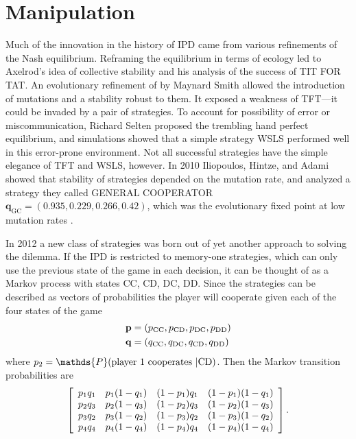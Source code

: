 

\chapter{Manipulation}

Much of the innovation in the history of IPD came from various refinements of the Nash equilibrium. Reframing the equilibrium in terms of ecology led to Axelrod's idea of collective stability and his analysis of the success of TIT FOR TAT. An evolutionary refinement of by Maynard Smith allowed the introduction of mutations and a stability robust to them. It exposed a weakness of TFT---it could be invaded by a pair of strategies. To account for possibility of error or miscommunication, Richard Selten proposed the trembling hand perfect equilibrium, and simulations showed that a simple strategy WSLS performed well in this error-prone environment. Not all successful strategies have the simple elegance of TFT and WSLS, however. In 2010 Iliopoulos, Hintze, and Adami showed that stability of strategies depended on the mutation rate, and analyzed a strategy they called GENERAL COOPERATOR $\mathbf{q}_{\textrm{GC}} = (0.935, 0.229, 0.266, 0.42)$, which was the evolutionary fixed point at low mutation rates \cite{iliopoulos_2010}.

In 2012 a new class of strategies was born out of yet another approach to solving the dilemma. If the IPD is restricted to memory-one strategies, which can only use the previous state of the game in each decision, it can be thought of as a Markov process with states CC, CD, DC, DD. Since the strategies can be described as vectors of probabilities the player will cooperate given each of the four states of the game
\begin{align*}
\mathbf{p} &= (p_{\textrm{CC}}, p_{\textrm{CD}}, p_{\textrm{DC}}, p_{\textrm{DD}}) \\
\mathbf{q} &= (q_{\textrm{CC}}, q_{\textrm{DC}}, q_{\textrm{CD}}, q_{\textrm{DD}})
\end{align*}
where $p_2 = \mathds{P}(\textrm{player 1 cooperates } | \CD)$. Then the Markov transition probabilities are
\[
\left[
\begin{array}{c c c c}
p_1q_1 & p_1 (1-q_1) & (1-p_1)q_1 & (1-p_1)(1-q_1) \\
p_2q_3 & p_2 (1-q_3) & (1-p_2)q_3 & (1-p_2)(1-q_3) \\
p_3q_2 & p_3 (1-q_2) & (1-p_3)q_2 & (1-p_3)(1-q_2) \\
p_4q_4 & p_4 (1-q_4) & (1-p_4)q_4 & (1-p_4)(1-q_4)
\end{array}
\right]
.\]

